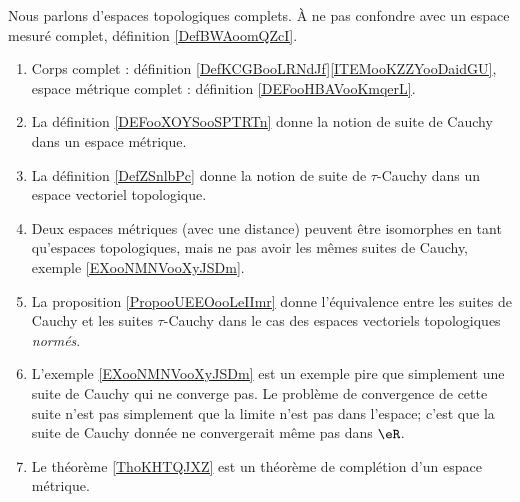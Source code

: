      \label{THMooOCXTooWenIJE}

Nous parlons d'espaces topologiques complets. À ne pas confondre avec un espace mesuré complet, définition \ref{DefBWAoomQZcI}.

\begin{enumerate}
    \item
        Corps complet : définition \ref{DefKCGBooLRNdJf}\ref{ITEMooKZZYooDaidGU}, espace métrique complet : définition \ref{DEFooHBAVooKmqerL}.
    \item
        La définition \ref{DEFooXOYSooSPTRTn} donne la notion de suite de Cauchy dans un espace métrique.
    \item
        La définition \ref{DefZSnlbPc} donne la notion de suite de \( \tau\)-Cauchy dans un espace vectoriel topologique.
    \item
        Deux espaces métriques (avec une distance) peuvent être isomorphes en tant qu'espaces topologiques, mais ne pas avoir les mêmes suites de Cauchy, exemple \ref{EXooNMNVooXyJSDm}.
    \item
        La proposition \ref{PropooUEEOooLeIImr} donne l'équivalence entre les suites de Cauchy et les suites \( \tau\)-Cauchy dans le cas des espaces vectoriels topologiques \emph{normés}.
    \item
        L'exemple \ref{EXooNMNVooXyJSDm} est un exemple pire que simplement une suite de Cauchy qui ne converge pas. Le problème de convergence de cette suite n'est pas simplement que la limite n'est pas dans l'espace; c'est que la suite de Cauchy donnée ne convergerait même pas dans \( \eR\).
    \item
        Le théorème \ref{ThoKHTQJXZ} est un théorème de complétion d'un espace métrique.
\end{enumerate}

